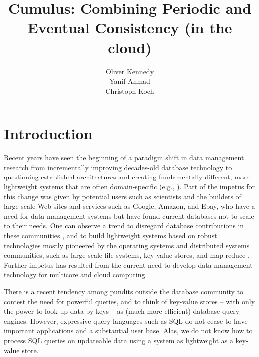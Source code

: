 \documentclass{vldb}
\title{Cumulus: Combining Periodic and Eventual Consistency (in the cloud)}
\author{
\alignauthor
Oliver Kennedy\\
  \affaddr{Cornell University}
  \affaddr{okennedy@cs.cornell.edu}
\alignauthor
Yanif Ahmad\\
  \affaddr{Cornell University}
  \affaddr{yanif@cs.cornell.edu}
\alignauthor
Christoph Koch\\
  \affaddr{Cornell University}
  \affaddr{koch@cs.cornell.edu}
}
\date{}
\begin{document}
\maketitle

\begin{abstract}

\end{abstract}

\section{Introduction}

Recent years have seen the beginning of a paradigm shift in data management
research from incrementally improving decades-old database technology
to questioning established architectures 
and creating fundamentally different, more lightweight systems
that are often domain-specific
(e.g.,
\cite{DBLP:conf/vldb/StonebrakerMAHHH07,DBLP:journals/pvldb/KallmanKNPRZJMSZHA08}).
Part of the impetus for this change was given by 
potential users such as scientists and the builders of
large-scale Web sites and services such as Google, Amazon, and Ebay,
who have a need for data management systems but have found current databases
not to scale to their needs.
One can observe a trend to disregard database contributions
in these communities \cite{dbcolumn, DBLP:conf/sigmod/PavloPRADMS09}, and to build lightweight systems based on
robust technologies mostly pioneered by the operating systems and distributed
systems communities, such as large scale file systems, key-value stores, and
map-reduce
\cite{DBLP:journals/cacm/DeanG08, DBLP:journals/tocs/ChangDGHWBCFG08}.
Further impetus has resulted from the current need to develop data management
technology for multicore and cloud computing.
%

There is a recent tendency
among pundits
outside the database community to
contest the need for powerful queries, and to
think of key-value stores -- with only the power to look up data by
keys -- as (much more efficient) database query engines.
%
%
However, expressive query languages such as SQL do not cease to have
important applications and a substantial user base.
Alas, we do not know how to process SQL queries on updateable data
using a system as lightweight as a key-value store.
\end{document}
